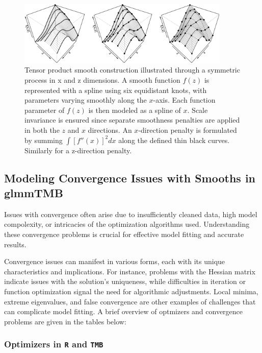 \documentclass[12pt, twoside,hidelinks]{article}
\theoremstyle{definition}
\numberwithin{equation}{section}
\begin{document}
\begin{figure}[H]
    \centering
    \includegraphics[width=0.9\textwidth]{visuals/tensor_product_smooth.png}
    \caption{Tensor product smooth construction illustrated through a symmetric process in x and z dimensions. A smooth function \(f(z)\) is represented with a spline using six equidistant knots, with parameters varying smoothly along the \(x\)-axis. Each function parameter of \(f(z)\) is then modeled as a spline of \(x\). Scale invariance is ensured since separate smoothness penalties are applied in both the \(z\) and \(x\) directions. An \(x\)-direction penalty is formulated by summing \(\int \left[ f''(x) \right]^2 dx\) along the defined thin black curves. Similarly for a z-direction penalty.   \cite{wood2020inference}}
    \label{fig:tps}
\end{figure}

\newpage

\subsection{Modeling Convergence Issues with Smooths in \textbf{glmmTMB}}

Issues with convergence often arise due to insufficiently cleaned data, high model compolexity, or intricacies of the optimization algorithms used. Understanding these convergence problems is crucial for effective model fitting and accurate results.
\newline

Convergence issues can manifest in various forms, each with its unique characteristics and implications. For instance, problems with the Hessian matrix indicate issues with the solution's uniqueness, while difficulties in iteration or function optimization signal the need for algorithmic adjustments. Local minima, extreme eigenvalues, and false convergence are other examples of challenges that can complicate model fitting. A brief overview of optmizers and convergence problems are given in the tables below:

\subsubsection{Optimizers in \texttt{R} and \texttt{TMB}}
\end{document}
